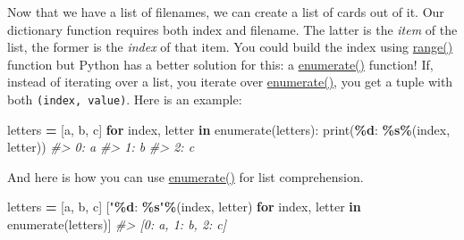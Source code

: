 \documentclass[
]{book}
\newenvironment{Shaded}{\begin{snugshade}}{\end{snugshade}}
\newcommand{\BuiltInTok}[1]{#1}
\newcommand{\CommentTok}[1]{\textcolor[rgb]{0.56,0.35,0.01}{\textit{#1}}}
\newcommand{\ControlFlowTok}[1]{\textcolor[rgb]{0.13,0.29,0.53}{\textbf{#1}}}
\newcommand{\KeywordTok}[1]{\textcolor[rgb]{0.13,0.29,0.53}{\textbf{#1}}}
\newcommand{\NormalTok}[1]{#1}
\newcommand{\OperatorTok}[1]{\textcolor[rgb]{0.81,0.36,0.00}{\textbf{#1}}}
\newcommand{\SpecialCharTok}[1]{\textcolor[rgb]{0.81,0.36,0.00}{\textbf{#1}}}
\newcommand{\StringTok}[1]{\textcolor[rgb]{0.31,0.60,0.02}{#1}}
\begin{document}
Now that we have a list of filenames, we can create a list of cards out of it. Our dictionary function requires both index and filename. The latter is the \emph{item} of the list, the former is the \emph{index} of that item. You could build the index using \protect\hyperlink{range}{range()} function but Python has a better solution for this: a \href{https://docs.python.org/3/library/functions.html\#enumerate}{enumerate()} function! If, instead of iterating over a list, you iterate over \href{https://docs.python.org/3/library/functions.html\#enumerate}{enumerate()}, you get a tuple with both \texttt{(index,\ value)}. Here is an example:

\begin{Shaded}
\begin{Highlighting}[]
\NormalTok{letters }\OperatorTok{=}\NormalTok{ [}\StringTok{\textquotesingle{}a\textquotesingle{}}\NormalTok{, }\StringTok{\textquotesingle{}b\textquotesingle{}}\NormalTok{, }\StringTok{\textquotesingle{}c\textquotesingle{}}\NormalTok{]}
\ControlFlowTok{for}\NormalTok{ index, letter }\KeywordTok{in} \BuiltInTok{enumerate}\NormalTok{(letters):}
    \BuiltInTok{print}\NormalTok{(}\StringTok{\textquotesingle{}}\SpecialCharTok{\%d}\StringTok{: }\SpecialCharTok{\%s}\StringTok{\textquotesingle{}}\OperatorTok{\%}\NormalTok{(index, letter))}
\CommentTok{\#\textgreater{} 0: a}
\CommentTok{\#\textgreater{} 1: b}
\CommentTok{\#\textgreater{} 2: c}
\end{Highlighting}
\end{Shaded}

And here is how you can use \href{https://docs.python.org/3/library/functions.html\#enumerate}{enumerate()} for list comprehension.

\begin{Shaded}
\begin{Highlighting}[]
\NormalTok{letters }\OperatorTok{=}\NormalTok{ [}\StringTok{\textquotesingle{}a\textquotesingle{}}\NormalTok{, }\StringTok{\textquotesingle{}b\textquotesingle{}}\NormalTok{, }\StringTok{\textquotesingle{}c\textquotesingle{}}\NormalTok{]}
\NormalTok{[}\StringTok{"}\SpecialCharTok{\%d}\StringTok{: }\SpecialCharTok{\%s}\StringTok{"}\OperatorTok{\%}\NormalTok{(index, letter) }\ControlFlowTok{for}\NormalTok{ index, letter }\KeywordTok{in} \BuiltInTok{enumerate}\NormalTok{(letters)]}
\CommentTok{\#\textgreater{} [\textquotesingle{}0: a\textquotesingle{}, \textquotesingle{}1: b\textquotesingle{}, \textquotesingle{}2: c\textquotesingle{}]}
\end{Highlighting}
\end{Shaded}
\end{document}
